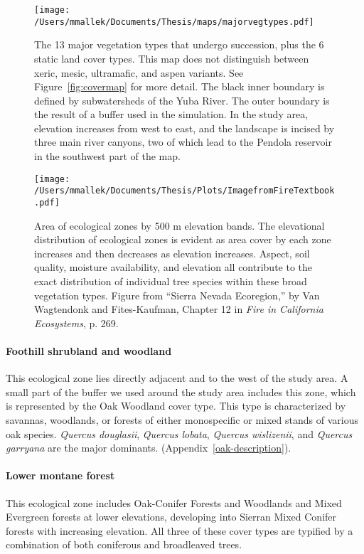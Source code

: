 \begin{figure}[!htbp]
\centering
\texttt{[image: /Users/mmallek/Documents/Thesis/maps/majorvegtypes.pdf]}
\caption{The 13 major vegetation types that undergo succession, plus the 6 static land cover types. This map does not distinguish between xeric, mesic, ultramafic, and aspen variants. See Figure~\ref{fig:covermap} for more detail. The black inner boundary is defined by subwatersheds of the Yuba River. The outer boundary is the result of a buffer used in the simulation. In the study area, elevation increases from west to east, and the landscape is incised by three main river canyons, two of which lead to the Pendola reservoir in the southwest part of the map.
}
\label{fig:majorvegtypes}
\end{figure}

\begin{figure}[!htbp]
\centering
\texttt{[image: /Users/mmallek/Documents/Thesis/Plots/ImagefromFireTextbook.pdf]}
\caption{Area of ecological zones by 500 m elevation bands. The elevational distribution of ecological zones is evident as area cover by each zone increases and then decreases as elevation increases. Aspect, soil quality, moisture availability, and elevation all contribute to the exact distribution of individual tree species within these broad vegetation types. Figure from ``Sierra Nevada Ecoregion,'' by Van Wagtendonk and Fites-Kaufman, Chapter 12 in \emph{Fire in California Ecosystems}, p. 269.}
\label{fig:ecologicalzonebands}
\end{figure}

\paragraph{Foothill shrubland and woodland} This ecological zone lies directly adjacent and to the west of the study area. A small part of the buffer we used around the study area includes this zone, which is represented by the Oak Woodland cover type. This type is characterized by savannas, woodlands, or forests of either monospecific or mixed stands of various oak species. \emph{Quercus douglasii}, \emph{Quercus lobata}, \emph{Quercus wislizenii}, and \emph{Quercus garryana} are the major dominants. (Appendix~\ref{oak-description}). 

\paragraph{Lower montane forest} This ecological zone includes Oak-Conifer Forests and Woodlands and Mixed Evergreen forests at lower elevations, developing into Sierran Mixed Conifer forests with increasing elevation. All three of these cover types are typified by a combination of both coniferous and broadleaved trees. 

